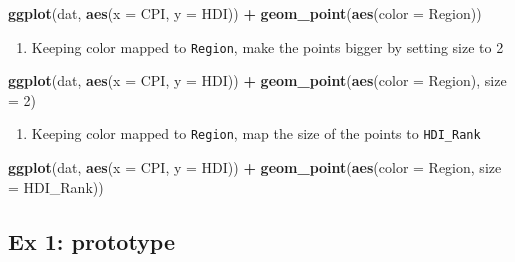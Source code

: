 \documentclass[]{book}
\newenvironment{Shaded}{\begin{snugshade}}{\end{snugshade}}
\newcommand{\KeywordTok}[1]{\textcolor[rgb]{0.13,0.29,0.53}{\textbf{#1}}}
\newcommand{\DataTypeTok}[1]{\textcolor[rgb]{0.13,0.29,0.53}{#1}}
\newcommand{\DecValTok}[1]{\textcolor[rgb]{0.00,0.00,0.81}{#1}}
\newcommand{\StringTok}[1]{\textcolor[rgb]{0.31,0.60,0.02}{#1}}
\newcommand{\OperatorTok}[1]{\textcolor[rgb]{0.81,0.36,0.00}{\textbf{#1}}}
\newcommand{\NormalTok}[1]{#1}
\providecommand{\tightlist}{%
  \setlength{\itemsep}{0pt}\setlength{\parskip}{0pt}}
\begin{document}
\begin{Shaded}
\begin{Highlighting}[]
\KeywordTok{ggplot}\NormalTok{(dat, }\KeywordTok{aes}\NormalTok{(}\DataTypeTok{x =}\NormalTok{ CPI, }\DataTypeTok{y =}\NormalTok{ HDI)) }\OperatorTok{+}
\StringTok{  }\KeywordTok{geom_point}\NormalTok{(}\KeywordTok{aes}\NormalTok{(}\DataTypeTok{color =}\NormalTok{ Region))}
\end{Highlighting}
\end{Shaded}

\begin{enumerate}
\def\labelenumi{\arabic{enumi}.}
\setcounter{enumi}{3}
\tightlist
\item
  Keeping color mapped to \texttt{Region}, make the points bigger by
  setting size to 2
\end{enumerate}

\begin{Shaded}
\begin{Highlighting}[]
\KeywordTok{ggplot}\NormalTok{(dat, }\KeywordTok{aes}\NormalTok{(}\DataTypeTok{x =}\NormalTok{ CPI, }\DataTypeTok{y =}\NormalTok{ HDI)) }\OperatorTok{+}
\StringTok{  }\KeywordTok{geom_point}\NormalTok{(}\KeywordTok{aes}\NormalTok{(}\DataTypeTok{color =}\NormalTok{ Region), }\DataTypeTok{size =} \DecValTok{2}\NormalTok{)}
\end{Highlighting}
\end{Shaded}

\begin{enumerate}
\def\labelenumi{\arabic{enumi}.}
\setcounter{enumi}{4}
\tightlist
\item
  Keeping color mapped to \texttt{Region}, map the size of the points to
  \texttt{HDI\_Rank}
\end{enumerate}

\begin{Shaded}
\begin{Highlighting}[]
\KeywordTok{ggplot}\NormalTok{(dat, }\KeywordTok{aes}\NormalTok{(}\DataTypeTok{x =}\NormalTok{ CPI, }\DataTypeTok{y =}\NormalTok{ HDI)) }\OperatorTok{+}
\KeywordTok{geom_point}\NormalTok{(}\KeywordTok{aes}\NormalTok{(}\DataTypeTok{color =}\NormalTok{ Region, }\DataTypeTok{size =}\NormalTok{  HDI_Rank))}
\end{Highlighting}
\end{Shaded}

\subsection{Ex 1: prototype}\label{ex-1-prototype-2}
\end{document}
